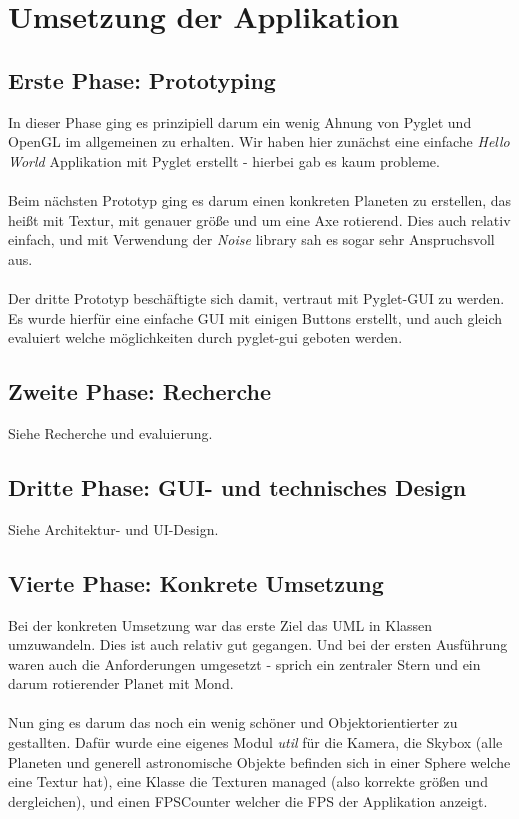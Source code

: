 \section{Umsetzung der Applikation}
\label{sec:umsetzung}

\subsection{Erste Phase: Prototyping}
In dieser Phase ging es prinzipiell darum ein wenig Ahnung von Pyglet und OpenGL im
allgemeinen zu erhalten. Wir haben hier zunächst eine einfache \textit{Hello World} Applikation
mit Pyglet erstellt - hierbei gab es kaum probleme.
\\ \\
Beim nächsten Prototyp ging es darum einen konkreten Planeten zu erstellen, das heißt mit Textur, 
mit genauer größe und um eine Axe rotierend. Dies auch relativ einfach, und mit Verwendung der
\textit{Noise} library sah es sogar sehr Anspruchsvoll aus. 
\\ \\
Der dritte Prototyp beschäftigte sich damit, vertraut mit Pyglet-GUI zu werden. Es wurde hierfür
eine einfache GUI mit einigen Buttons erstellt, und auch gleich evaluiert welche möglichkeiten
durch pyglet-gui geboten werden.

\subsection{Zweite Phase: Recherche}
Siehe Recherche und evaluierung.

\subsection{Dritte Phase: GUI- und technisches Design}
Siehe Architektur- und UI-Design.

\subsection{Vierte Phase: Konkrete Umsetzung}
Bei der konkreten Umsetzung war das erste Ziel das UML in Klassen umzuwandeln. Dies ist auch relativ
gut gegangen. Und bei der ersten Ausführung waren auch die Anforderungen umgesetzt - sprich ein
zentraler Stern und ein darum rotierender Planet mit Mond. 
\\ \\
Nun ging es darum das noch ein wenig schöner und Objektorientierter zu gestallten. Dafür wurde eine
eigenes Modul \textit{util} für die Kamera, die Skybox (alle Planeten und generell astronomische Objekte befinden
sich in einer Sphere welche eine Textur hat), eine Klasse die Texturen managed (also korrekte größen und dergleichen),
und einen FPSCounter welcher die FPS der Applikation anzeigt.

